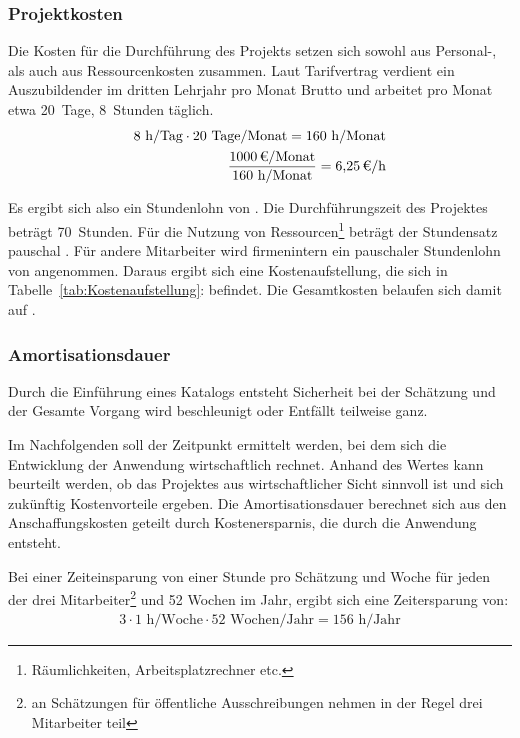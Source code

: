\subsubsection{Projektkosten}
\label{sec:Projektkosten}

Die Kosten für die Durchführung des Projekts setzen sich sowohl aus Personal-,
als auch aus Ressourcenkosten zusammen. Laut Tarifvertrag verdient ein
Auszubildender im dritten Lehrjahr pro Monat  Brutto und arbeitet pro
Monat etwa 20~Tage, 8~Stunden täglich.
\begin{eqnarray*}
8 \mbox{ h/Tag} \cdot 20 \mbox{ Tage/Monat} = 160 \mbox{ h/Monat}\\
\frac{\eur{1000} \mbox{/Monat}}{160 \mbox{ h/Monat}} = \eur{6,25}\mbox{/h}
\end{eqnarray*}

Es ergibt sich also ein Stundenlohn von . 
Die Durchführungszeit des Projektes beträgt 70~Stunden. Für die Nutzung von
Ressourcen\footnote{Räumlichkeiten, Arbeitsplatzrechner etc.} beträgt der
Stundensatz pauschal . Für andere Mitarbeiter wird firmenintern
ein pauschaler Stundenlohn von  angenommen. Daraus ergibt sich eine
Kostenaufstellung, die sich in Tabelle~\ref{tab:Kostenaufstellung}:
 befindet. Die Gesamtkosten belaufen sich damit
auf .

\subsubsection{Amortisationsdauer}
\label{sec:Amortisationsdauer}
Durch die Einführung eines Katalogs entsteht Sicherheit bei der Schätzung und
der Gesamte Vorgang wird beschleunigt oder Entfällt teilweise ganz.

Im Nachfolgenden soll der Zeitpunkt ermittelt werden, bei dem sich die
Entwicklung der Anwendung wirtschaftlich rechnet. Anhand des Wertes kann
beurteilt werden, ob das Projektes aus wirtschaftlicher Sicht sinnvoll ist und
sich zukünftig Kostenvorteile ergeben. Die Amortisationsdauer berechnet sich aus
den Anschaffungskosten geteilt durch Kostenersparnis, die durch die Anwendung
entsteht.

Bei einer Zeiteinsparung von einer Stunde pro Schätzung und Woche für jeden der
drei Mitarbeiter\footnote{an Schätzungen für öffentliche Ausschreibungen nehmen
in der Regel drei Mitarbeiter teil} und 52 Wochen im Jahr, ergibt sich eine
Zeitersparung von:
\begin{eqnarray*}
3 \cdot 1 \mbox{ h/Woche} \cdot 52 \mbox{ Wochen/Jahr} = 156 \mbox{ h/Jahr}
\end{eqnarray*}


